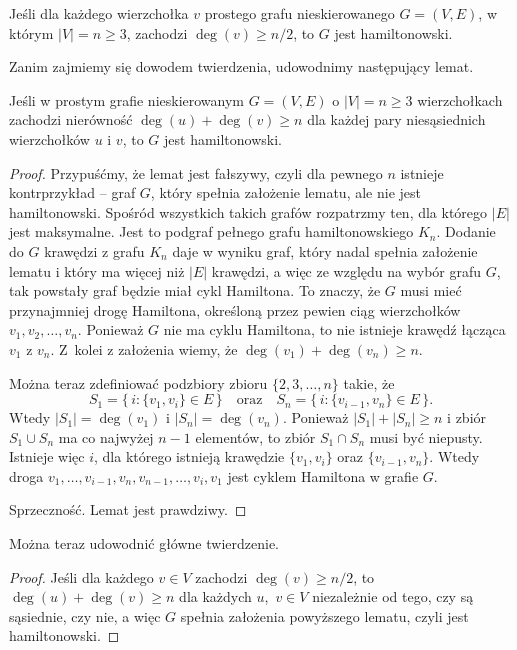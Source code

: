 \subexercise{} %
\begin{twierdzenie}[Dirac]
	Jeśli dla każdego wierzchołka $v$ prostego grafu nieskierowanego $G=(V,E)$, w którym $|V|=n\ge3$, zachodzi $\deg(v)\ge n/2$, to $G$ jest hamiltonowski.
\end{twierdzenie}
Zanim zajmiemy się dowodem twierdzenia, udowodnimy następujący lemat.
\begin{lemat}[Ore]
	Jeśli w prostym grafie nieskierowanym $G=(V,E)$ o $|V|=n\ge3$ wierzchołkach zachodzi nierówność $\deg(u)+\deg(v)\ge n$ dla każdej pary niesąsiednich wierzchołków $u$ i $v$, to $G$ jest hamiltonowski.
\end{lemat}
\begin{proof}
Przypuśćmy, że lemat jest fałszywy, czyli dla pewnego $n$ istnieje kontrprzykład -- graf $G$, który spełnia założenie lematu, ale nie jest hamiltonowski. Spośród wszystkich takich grafów rozpatrzmy ten, dla którego $|E|$ jest maksymalne. Jest to podgraf pełnego grafu hamiltonowskiego $K_n$. Dodanie do $G$ krawędzi z grafu $K_n$ daje w wyniku graf, który nadal spełnia założenie lematu i który ma więcej niż $|E|$ krawędzi, a więc ze względu na wybór grafu $G$, tak powstały graf będzie miał cykl Hamiltona. To znaczy, że $G$ musi mieć przynajmniej drogę Hamiltona, określoną przez pewien ciąg wierzchołków $v_1,v_2,\dots,v_n$. Ponieważ $G$ nie ma cyklu Hamiltona, to nie istnieje krawędź łącząca $v_1$ z $v_n$. Z~kolei z założenia wiemy, że $\deg(v_1)+\deg(v_n)\ge n$.

Można teraz zdefiniować podzbiory zbioru $\{2,3,\dots,n\}$ takie, że
\[
	S_1 = \bigl\{\,i:\{v_1,v_i\}\in E\,\bigr\} \quad\text{oraz}\quad S_n = \bigl\{\,i:\{v_{i-1},v_n\}\in E\,\bigr\}.
\]
Wtedy $|S_1|=\deg(v_1)$ i $|S_n|=\deg(v_n)$. Ponieważ $|S_1|+|S_n|\ge n$ i zbiór $S_1\cup S_n$ ma co najwyżej $n-1$ elementów, to zbiór $S_1\cap S_n$ musi być niepusty. Istnieje więc $i$, dla którego istnieją krawędzie $\{v_1,v_i\}$ oraz $\{v_{i-1},v_n\}$. Wtedy droga $v_1,\dots,v_{i-1},v_n,v_{n-1},\dots,v_i,v_1$ jest cyklem Hamiltona w grafie $G$.

Sprzeczność. Lemat jest prawdziwy.
\end{proof}

Można teraz udowodnić główne twierdzenie.
\begin{proof}
Jeśli dla każdego $v\in V$ zachodzi $\deg(v)\ge n/2$, to $\deg(u)+\deg(v)\ge n$ dla każdych $u$,~$v\in V$ niezależnie od tego, czy są sąsiednie, czy nie, a więc $G$ spełnia założenia powyższego lematu, czyli jest hamiltonowski.
\end{proof}

